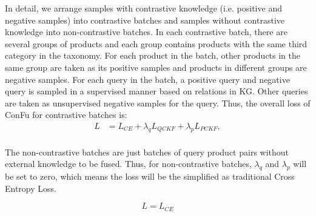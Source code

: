 In detail, we arrange samples with contrastive knowledge (i.e. positive and negative samples) into contrastive batches and samples without contrastive knowledge into non-contrastive batches. In each contrastive batch, there are several groups of products and each group contains products with the same third category in the taxonomy. For each product in the batch, other products in the same group are taken as its positive samples and products in different groups are negative samples. For each query in the batch, a positive query and negative query is sampled in a supervised manner based on relations in KG. Other queries are taken as unsupervised negative samples for the query. Thus, the overall loss of ConFu for contrastive batches is:
\begin{equation}
    \begin{aligned}
    L&= L_{CE} + \lambda_q L_{QCKF} + \lambda_p L_{PCKF}, \\
    \end{aligned}
\end{equation}

The non-contrastive batches are just batches of query product pairs without external knowledge to be fused. Thus, for non-contrastive batches, $\lambda_q$ and $\lambda_p$ will be set to zero, which means the loss will be the simplified as traditional Cross Entropy Loss. 

\begin{equation}
    L = L_{CE}
\end{equation}

